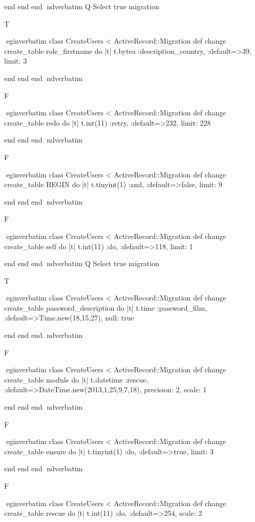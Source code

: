     end 
  end 
end
nd{verbatim}
Q
 Select true migration

T

egin{verbatim}
 class CreateUsers < ActiveRecord::Migration 
  def change 
    create_table role_firstname do |t| 
      t.bytea :description_country, :default=>39, limit: 3
    
    end 
  end 
end
nd{verbatim}

F

egin{verbatim}
 class CreateUsers < ActiveRecord::Migration 
  def change 
    create_table redo do |t| 
      t.int(11) :retry, :default=>232, limit: 228
    
    end 
  end 
end
nd{verbatim}

F

egin{verbatim}
 class CreateUsers < ActiveRecord::Migration 
  def change 
    create_table BEGIN do |t| 
      t.tinyint(1) :and, :default=>false, limit: 9
    
    end 
  end 
end
nd{verbatim}

F

egin{verbatim}
 class CreateUsers < ActiveRecord::Migration 
  def change 
    create_table self do |t| 
      t.int(11) :do, :default=>118, limit: 1
    
    end 
  end 
end
nd{verbatim}
Q
 Select true migration

T

egin{verbatim}
 class CreateUsers < ActiveRecord::Migration 
  def change 
    create_table password_description do |t| 
      t.time :password_film, :default=>Time.new(18,15,27), null: true
    
    end 
  end 
end
nd{verbatim}

F

egin{verbatim}
 class CreateUsers < ActiveRecord::Migration 
  def change 
    create_table module do |t| 
      t.datetime :rescue, :default=>DateTime.new(2013,1,25,9,7,18), precision: 2, scale: 1
    
    end 
  end 
end
nd{verbatim}

F

egin{verbatim}
 class CreateUsers < ActiveRecord::Migration 
  def change 
    create_table ensure do |t| 
      t.tinyint(1) :do, :default=>true, limit: 3
    
    end 
  end 
end
nd{verbatim}

F

egin{verbatim}
 class CreateUsers < ActiveRecord::Migration 
  def change 
    create_table rescue do |t| 
      t.int(11) :do, :default=>254, scale: 2
    
